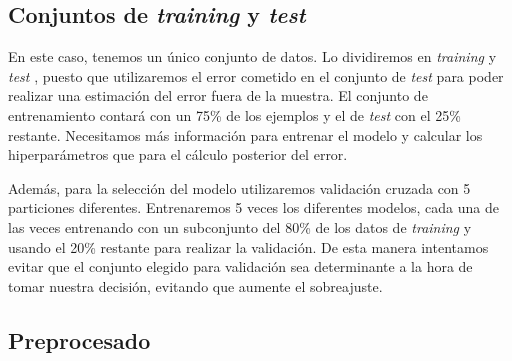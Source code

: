 \documentclass[a4paper, 20pt]{article}
\newcommand{\training}{\textit{training }}
\newcommand{\test}{\textit{test }}
\begin{document}
{\subsection{Conjuntos de \textit{training} y \textit{test}}

En este caso, tenemos un único conjunto de datos. Lo dividiremos en \training y \test, puesto que utilizaremos el error cometido en el conjunto de \test para poder realizar una estimación del error fuera de la muestra. El conjunto de entrenamiento contará con un 75\% de los ejemplos y el de \test con el 25\% restante. Necesitamos más información para entrenar el modelo y calcular los hiperparámetros que para el cálculo posterior del error.

Además, para la selección del modelo utilizaremos validación cruzada con 5 particiones diferentes. Entrenaremos 5 veces los diferentes modelos, cada una de las veces entrenando con un subconjunto del 80\% de los datos de \training y usando el 20\% restante para realizar la validación. De esta manera intentamos evitar que el conjunto elegido para validación sea determinante a la hora de tomar nuestra decisión, evitando que aumente el sobreajuste.


\subsection{Preprocesado}

}
\end{document}
